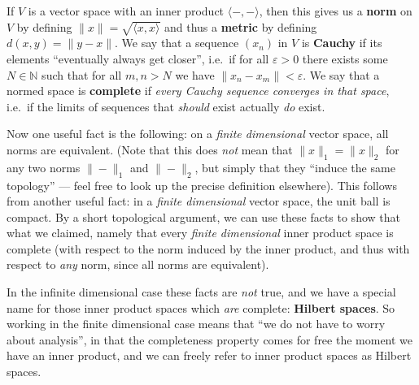\documentclass[fleqn]{article}
\newenvironment{technical}{\noindent}{\medskip}
\begin{document}
\begin{technical}
If \(V\) is a vector space with an inner product \(\langle-,-\rangle\), then this gives us a \textbf{norm} on \(V\) by defining \(\|x\|=\sqrt{\langle x,x\rangle}\) and thus a \textbf{metric} by defining \(d(x,y)=\|y-x\|\).
We say that a sequence \((x_n)\) in \(V\) is \textbf{Cauchy} if its elements ``eventually always get closer'', i.e.~if for all \(\varepsilon>0\) there exists some \(N\in\mathbb{N}\) such that for all \(m,n>N\) we have \(\|x_n-x_m\|<\varepsilon\).
We say that a normed space is \textbf{complete} if \emph{every Cauchy sequence converges in that space}, i.e.~if the limits of sequences that \emph{should} exist actually \emph{do} exist.

Now one useful fact is the following: on a \emph{finite dimensional} vector space, all norms are equivalent.
(Note that this does \emph{not} mean that \(\|x\|_1=\|x\|_2\) for any two norms \(\|-\|_1\) and \(\|-\|_2\), but simply that they ``induce the same topology'' --- feel free to look up the precise definition elsewhere).
This follows from another useful fact: in a \emph{finite dimensional} vector space, the unit ball is compact.
By a short topological argument, we can use these facts to show that what we claimed, namely that every \emph{finite dimensional} inner product space is complete (with respect to the norm induced by the inner product, and thus with respect to \emph{any} norm, since all norms are equivalent).

In the infinite dimensional case these facts are \emph{not} true, and we have a special name for those inner product spaces which \emph{are} complete: \textbf{Hilbert spaces}.
So working in the finite dimensional case means that ``we do not have to worry about analysis'', in that the completeness property comes for free the moment we have an inner product, and we can freely refer to inner product spaces as Hilbert spaces.

\end{technical}
\end{document}
